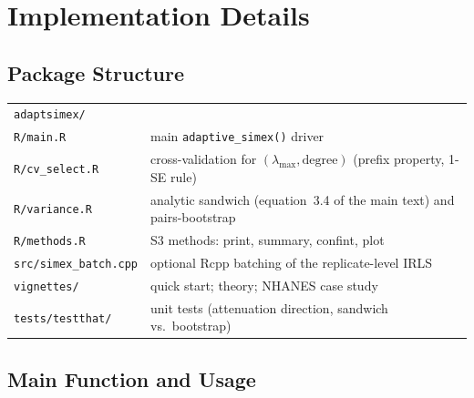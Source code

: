\appendix
\setcounter{section}{1}
\setcounter{subsection}{0}
\renewcommand{\thesubsection}{\thesection.\arabic{subsection}}
\setcounter{table}{0}
\renewcommand{\thetable}{B\arabic{table}}

\section{Implementation Details}\label{app:implementation}

\subsection*{Package Structure}\label{sec:package}

\begin{center}
\small
\begin{tabular}{ll}
\toprule
\texttt{adaptsimex/}\\
\quad\texttt{R/main.R} & main \texttt{adaptive\_simex()} driver\\
\quad\texttt{R/cv\_select.R} & cross-validation for
$(\lambda_{\max},\text{degree})$ (prefix property, 1-SE rule)\\
\quad\texttt{R/variance.R} & analytic sandwich (equation~3.4 of the main text)
and pairs-bootstrap\\
\quad\texttt{R/methods.R} & S3 methods: print, summary, confint, plot\\
\quad\texttt{src/simex\_batch.cpp} & optional Rcpp batching of the
replicate-level IRLS\\
\quad\texttt{vignettes/} & quick start; theory; NHANES case study\\
\quad\texttt{tests/testthat/} & unit tests (attenuation direction,
sandwich vs.\ bootstrap)\\
\bottomrule
\end{tabular}
\end{center}

\subsection*{Main Function and Usage}\label{sec:usage}

